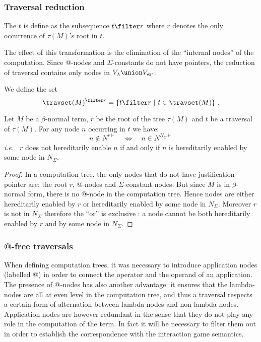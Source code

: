 \subsubsection{Traversal reduction}



\begin{definition}
The  $t$ is define as the subsequence $t\filter r$ where $r$ denotes the only occurrence of $\tau(M)$'s root in $t$.
\end{definition}
The effect of this transformation is the elimination of the
``internal nodes'' of the computation. Since @-nodes and
$\Sigma$-constants do not have pointers, the reduction of traversal
contains only nodes in $V_\lambda \union V_{\sf var}$.

We define the set
$$\travset(M)^{\filter r} = \{ t  \filter r \ | \  t  \in \travset(M) \} \ . $$


\begin{lemma}
\label{lem:betaeta_trav}
Let $M$ be a $\beta$-normal term, $r$ be the root of the tree $\tau(M)$ and
$t$ be a traversal of $\tau(M)$.
For any node $n$ occurring in $t$ we have:
$$ n \not\in N^{r\vdash} \quad \iff \quad n \in N^{N_{\Sigma}\vdash}$$
{\it i.e.}~ $r$ does not hereditarily enable $n$ if and only if $n$ is
hereditarily enabled by some node in $N_\Sigma$.
\end{lemma}
\begin{proof}
 In a computation tree, the only nodes that do not have justification pointer are:
the root $r$, @-nodes and $\Sigma$-constant nodes. But since $M$ is
in $\beta$-normal form, there is no @-node in the computation tree.
Hence nodes are either hereditarily enabled by $r$ or hereditarily
enabled by some node in $N_\Sigma$. Moreover $r$ is not in $N_\Sigma$
therefore the ``or'' is exclusive : a node cannot be both hereditarily
enabled by $r$ and by some node in $N_\Sigma$.
\end{proof}




\subsubsection{@-free traversals}

When defining computation trees, it was necessary to introduce
application nodes (labelled @) in order to connect the operator and
the operand of an application. The presence of @-nodes has also
another advantage: it ensures that the lambda-nodes are all at even
level in the computation tree, and thus a traversal respects a
certain form of alternation between lambda nodes and non-lambda
nodes. Application nodes are however redundant in the sense that
they do not play any role in the computation of the term. In fact it
will be necessary to filter them out in order to establish the
correspondence with the interaction game semantics.

